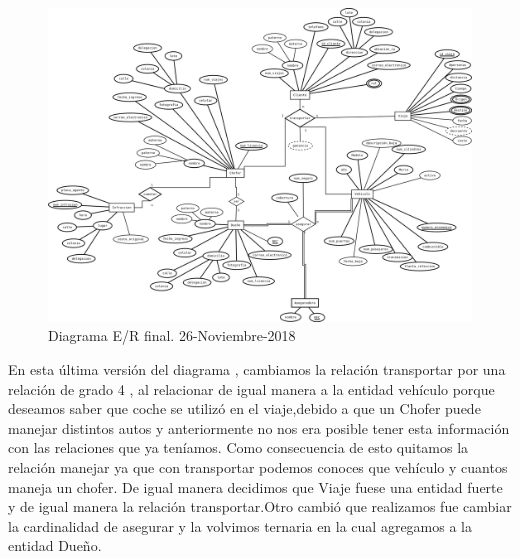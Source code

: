 \documentclass{article}
\begin{document}
\begin{figure}[H]
\begin{center}
\includegraphics[width=5in]{./img/R_boceto4.png}
\caption{Diagrama E/R final. 26-Noviembre-2018 }
\end{center}
\end{figure}
En esta última versión del diagrama , cambiamos la relación transportar por una relación de grado 4 , al relacionar de igual manera 
a la entidad vehículo porque deseamos saber que coche se utilizó en el viaje,debido a que un Chofer puede manejar distintos autos y 
anteriormente no nos era posible tener esta información con las relaciones que ya teníamos.
Como consecuencia de esto quitamos la relación manejar ya que con transportar podemos conoces que vehículo y cuantos maneja un chofer.
De igual manera decidimos que Viaje fuese una entidad fuerte y de igual manera la relación transportar.Otro cambió que realizamos fue 
cambiar la cardinalidad de asegurar y la volvimos ternaria en la cual agregamos a la entidad Dueño.
\end{document}
